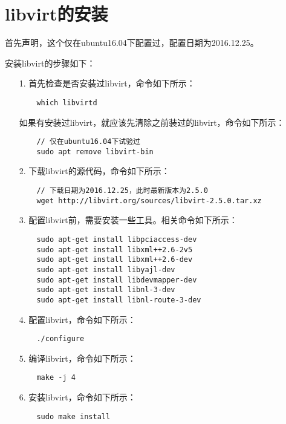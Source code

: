 \documentclass[a4paper,left=2.5cm,right=2.5cm,11pt]{article}
\begin{document}

\clearpage


\section{libvirt的安装}
	首先声明，这个仅在ubuntu16.04下配置过，配置日期为2016.12.25。\par
	安装libvirt的步骤如下：
	\begin{itemize}
		\item[1.] 首先检查是否安装过libvirt，命令如下所示：
		\begin{lstlisting}
	which libvirtd
		\end{lstlisting}

		如果有安装过libvirt，就应该先清除之前装过的libvirt，命令如下所示：
		\begin{lstlisting}
	// 仅在ubuntu16.04下试验过
	sudo apt remove libvirt-bin
		\end{lstlisting}

		\item[2.] 下载libvirt的源代码，命令如下所示：
		\begin{lstlisting}
	// 下载日期为2016.12.25，此时最新版本为2.5.0
	wget http://libvirt.org/sources/libvirt-2.5.0.tar.xz
		\end{lstlisting}

		\item[3.] 配置libvirt前，需要安装一些工具。相关命令如下所示：
		\begin{lstlisting}
	sudo apt-get install libpciaccess-dev
	sudo apt-get install libxml++2.6-2v5
	sudo apt-get install libxml++2.6-dev
	sudo apt-get install libyajl-dev
	sudo apt-get install libdevmapper-dev
	sudo apt-get install libnl-3-dev
	sudo apt-get install libnl-route-3-dev
		\end{lstlisting}

		\item[4.] 配置libvirt，命令如下所示：
		\begin{lstlisting}
	./configure
		\end{lstlisting}

		\item[5.] 编译libvirt，命令如下所示：
		\begin{lstlisting}
	make -j 4
		\end{lstlisting}

		\item[6.] 安装libvirt，命令如下所示：
		\begin{lstlisting}
	sudo make install
		\end{lstlisting}


\end{itemize}
\end{document}
